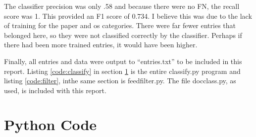 \documentclass[paper=a4, fontsize=11pt]{scrartcl} %
\numberwithin{equation}{section} %
\numberwithin{figure}{section} %
\numberwithin{table}{section} %
\begin{document}


The classifier precision was only .58 and because there were no FN, the recall score was 1.
This provided an F1 score of 0.734.
I believe this was due to the lack of training for the paper and os categories.  
There were far fewer entries that belonged here, so they were not classified correctly by the classifier.
Perhaps if there had been more trained entries, it would have been higher.


Finally, all entries and data were output to ``entries.txt'' to be included in this report.\cite{bib:lfile}
Listing \ref{code:classify} in section \ref{sec:code} is the entire classify.py program and listing \ref{code:filter}, inthe same section
is feedfilter.py.
The file docclass.py, as used,  is included with this report.
\newpage
\section{Python Code}
\label{sec:code}






\newpage 


{}

\end{document}
